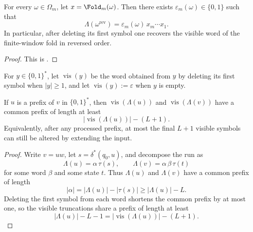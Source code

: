 \begin{lemma}
\label{lem:appendix-overflow-digit}
For every \(\omega\in\Omega_m\), let \(x=\Fold_m(\omega)\).  Then there exists
\(\varepsilon_m(\omega)\in\{0,1\}\) such that
\[
  \Lambda(\omega^{\mathrm{rev}})
  =
  \varepsilon_m(\omega)\,x_m\cdots x_1.
\]
In particular, after deleting its first symbol one recovers the visible word of
the finite-window fold in reversed order.
\end{lemma}

\begin{proof}
This is .
\end{proof}

\begin{definition}
\label{def:appendix-visible-truncation}
For \(y\in\{0,1\}^*\), let \(\operatorname{vis}(y)\) be the word obtained from
\(y\) by deleting its first symbol when \(|y|\ge 1\), and let
\(\operatorname{vis}(y):=\varepsilon\) when \(y\) is empty.
\end{definition}

\begin{lemma}
\label{lem:appendix-prefix-stability}
If \(u\) is a prefix of \(v\) in \(\{0,1\}^*\), then
\(\operatorname{vis}(\Lambda(u))\) and \(\operatorname{vis}(\Lambda(v))\) have
a common prefix of length at least
\[
  |\operatorname{vis}(\Lambda(u))|-(L+1).
\]
Equivalently, after any processed prefix, at most the final \(L+1\) visible
symbols can still be altered by extending the input.
\end{lemma}

\begin{proof}
Write \(v=uw\), let \(s=\delta^*(q_0,u)\), and decompose the run as
\[
  \Lambda(u)=\alpha\,\tau(s),
  \qquad
  \Lambda(v)=\alpha\,\beta\,\tau(t)
\]
for some word \(\beta\) and some state \(t\).  Thus \(\Lambda(u)\) and
\(\Lambda(v)\) have a common prefix of length
\[
  |\alpha|=|\Lambda(u)|-|\tau(s)|\ge |\Lambda(u)|-L.
\]
Deleting the first symbol from each word shortens the common prefix by at most
one, so the visible truncations share a prefix of length at least
\[
  |\Lambda(u)|-L-1=|\operatorname{vis}(\Lambda(u))|-(L+1).
\]
\end{proof}

